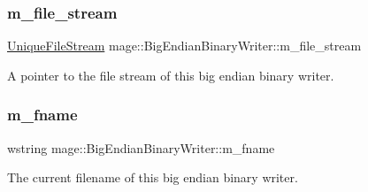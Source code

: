 \subsubsection{\texorpdfstring{m\+\_\+file\+\_\+stream}{m\_file\_stream}}
{\footnotesize\ttfamily \hyperlink{namespacemage_a0ee1bd45ad7dbb3dc8c8e1770e3538d4}{Unique\+File\+Stream} mage\+::\+Big\+Endian\+Binary\+Writer\+::m\+\_\+file\+\_\+stream\hspace{0.3cm}{\ttfamily [private]}}

A pointer to the file stream of this big endian binary writer. \hypertarget{classmage_1_1_big_endian_binary_writer_a5bf83b685bfce080f55458bdca2e698a}{}\label{classmage_1_1_big_endian_binary_writer_a5bf83b685bfce080f55458bdca2e698a} 
\subsubsection{\texorpdfstring{m\+\_\+fname}{m\_fname}}
{\footnotesize\ttfamily wstring mage\+::\+Big\+Endian\+Binary\+Writer\+::m\+\_\+fname\hspace{0.3cm}{\ttfamily [private]}}

The current filename of this big endian binary writer. 